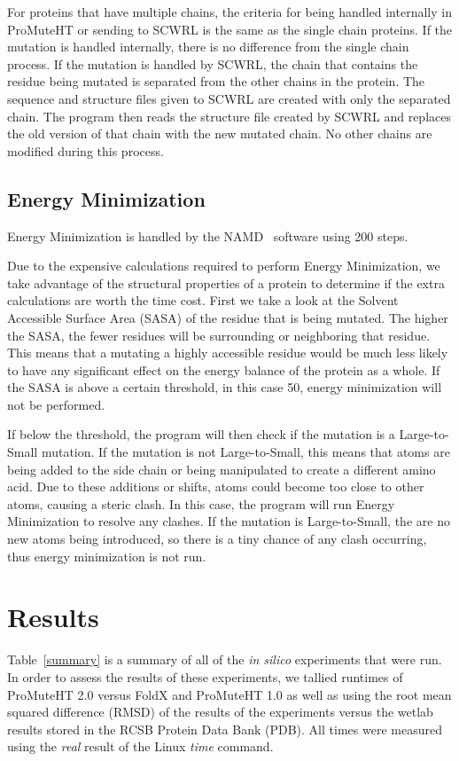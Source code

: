 \documentclass[sigconf]{acmart}
\begin{document}
For proteins that have multiple chains, the criteria for being handled internally in ProMuteHT or sending to SCWRL is the same as the single chain proteins.  If the mutation is handled internally, there is no difference from the single chain process.  If the mutation is handled by SCWRL, the chain that contains the residue being mutated is separated from the other chains in the protein.  The sequence and structure files given to SCWRL are created with only the separated chain.  The program then reads the structure file created by SCWRL and replaces the old version of that chain with the new mutated chain.  No other chains are modified during this process.

\subsection{Energy Minimization}
Energy Minimization is handled by the NAMD~\cite{phillips2005} software using 200 steps.

Due to the expensive calculations required to perform Energy Minimization, we take advantage of the structural properties of a protein to determine if the extra calculations are worth the time cost. First we take a look at the Solvent Accessible Surface Area (SASA) of the residue that is being mutated.  The higher the SASA, the fewer residues will be surrounding or neighboring that residue.  This means that a mutating a highly accessible residue would be much less likely to have any significant effect on the energy balance of the protein as a whole.  If the SASA is above a certain threshold, in this case 50, energy minimization will not be performed.  

If below the threshold, the program will then check if the mutation is a Large-to-Small mutation.  If the mutation is not Large-to-Small, this means that atoms are being added to the side chain or being manipulated to create a different amino acid.  Due to these additions or shifts, atoms could become too close to other atoms, causing a steric clash.  In this case, the program will run Energy Minimization to resolve any clashes.  If the mutation is Large-to-Small, the are no new atoms being introduced, so there is a tiny chance of any clash occurring, thus energy minimization is not run.


\section{Results}
Table~\ref{summary} is a summary of all of the \textit{in silico} experiments that were run.  In order to assess the results of these experiments, we tallied runtimes of ProMuteHT 2.0 versus FoldX and ProMuteHT 1.0 as well as using the root mean squared difference (RMSD) of the results of the experiments versus the wetlab results stored in the RCSB Protein Data Bank (PDB).  All times were measured using the \textit{real} result of the Linux \textit{time} command.
\end{document}

